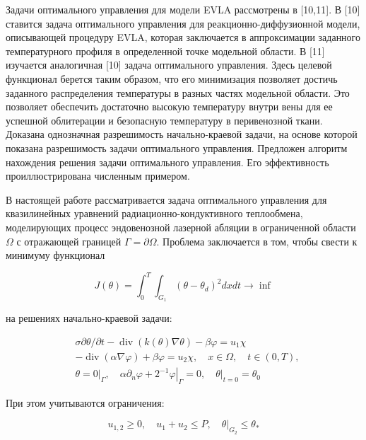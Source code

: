 Задачи оптимального управления для модели EVLA рассмотрены в [10,11].
В [10] ставится задача оптимального управления для реакционно-диффузионной модели,
описывающей процедуру EVLA, которая заключается в аппроксимации заданного температурного
профиля в определенной точке модельной области.
В [11] изучается аналогичная [10] задача оптимального управления.
Здесь целевой функционал берется таким образом, что его минимизация позволяет достичь
заданного распределения температуры в разных частях модельной области.
Это позволяет обеспечить достаточно высокую температуру внутри вены для ее успешной
облитерации и безопасную температуру в перивенозной ткани.
Доказана однозначная разрешимость начально-краевой задачи,
на основе которой показана разрешимость задачи оптимального управления.
Предложен алгоритм нахождения решения задачи оптимального управления.
Его эффективность проиллюстрирована численным примером.



В настоящей работе рассматривается задача оптимального управления для квазилинейных
уравнений радиационно-кондуктивного теплообмена, моделирующих процесс эндовенозной
лазерной абляции в ограниченной области $\Omega$ с отражающей границей $\Gamma=\partial\Omega$.
Проблема заключается в том, чтобы свести к минимуму функционал

\[ J(\theta)=\int_{0}^{T} \int_{G_{1}}\left(\theta-\theta_{d}\right)^{2} d x d t \rightarrow \inf \]

на решениях начально-краевой задачи:

\[
\begin{aligned}
&\sigma \partial \theta / \partial t-\operatorname{div}(k(\theta)
\nabla \theta)-\beta \varphi=u_{1} \chi \\
&-\operatorname{div}(\alpha \nabla \varphi)+\beta \varphi=u_{2}
\chi, \quad x \in \Omega, \quad t \in(0, T), \\
&\theta=\left.0\right|_{\Gamma}, \quad \alpha \partial_{n}
\varphi+\left.2^{-1} \varphi\right|_{\Gamma}=0,\left.\quad \theta\right|_{t=0}=\theta_{0}
\end{aligned}
\]

При этом учитываются ограничения:

\[
u_{1,2} \geq 0, \quad u_{1}+u_{2} \leq P,\left.\quad \theta\right|_{G_{2}} \leq \theta_{*}
\]

